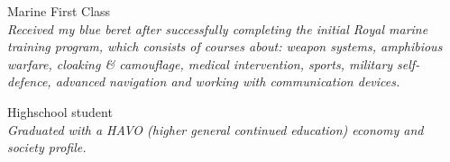 \normalsize\normalfont

\SmallSep


{Marine First Class}
\footnotesize\textit{\\
  Received my blue beret after successfully completing the initial Royal marine
  training program, which consists of courses about: weapon systems, amphibious
  warfare, cloaking \& camouflage, medical intervention, sports, military
  self-defence, advanced navigation and working with communication devices.
}

\normalsize\normalfont

\SmallSep


{Highschool student}
\footnotesize\textit{\\
  Graduated with a HAVO (higher general continued education) economy and
  society profile.
}

\normalsize\normalfont

\SmallSep


\Sep


~\CVSection{\raisebox{.2em}{Experience}}


